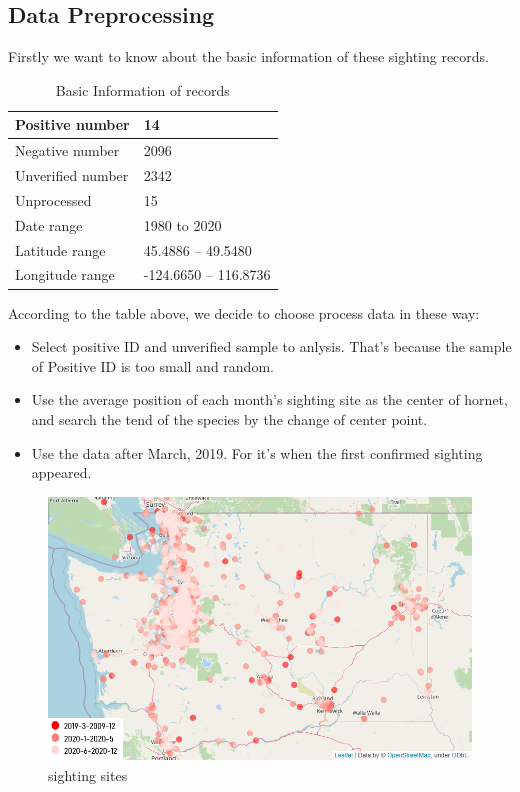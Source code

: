 \documentclass[12pt]{article}
\begin{document}
\subsection{Data Preprocessing}
Firstly we want to know about the basic information of these sighting records.
\begin{table}[H]
	\caption{Basic Information of records}  
	\small
	\begin{center}  
		\begin{tabular}{|m{7cm}<{\centering}|m{7cm}<{\centering}|}  
			\hline  
			Positive number & 14  \\ \hline  
			Negative number& 2096\\ \hline  
			Unverified number &2342 \\  
			\hline 
			Unprocessed & 15 \\  
			\hline  
			Date range &1980   to   2020 \\  
			\hline
		    Latitude range & 45.4886  --   49.5480\\  
			\hline
			Longitude range & -124.6650   --  116.8736\\  
			\hline
		\end{tabular}  
	\end{center}  
\end{table}

According to the table above, we decide to choose process data in these way:
\begin{itemize}
	\item Select positive ID and unverified sample to anlysis. That's because the sample of Positive ID is too small and  random.
	\item Use the average position of each month's sighting site as the center of hornet, and search the tend of the species by the change of center point.
	\item Use the data after March, 2019. For it's when the first confirmed sighting appeared.
\end{itemize}

\begin{figure}[H]
	\centering
	\includegraphics[width=14cm,height=7cm]{./pictures/distribute1.png}
	\caption{sighting sites}
\end{figure}
\end{document}
